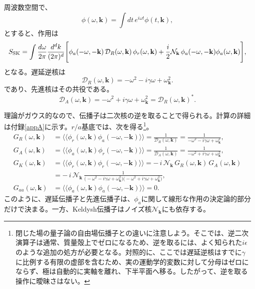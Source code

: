 \documentclass[a4paper,11pt,oneside]{article}
\theoremstyle{definition}
\numberwithin{equation}{section}
\begin{document}
周波数空間で、
\begin{equation}
\phi(\omega,\mathbf k)
=
\int dt\,e^{i\omega t}\phi(t,\mathbf k) ,
\end{equation}
とすると、作用は
\begin{align}
S_{\rm SK}
=
\int \frac{d\omega}{2\pi}\frac{d^d k}{(2\pi)^d}
\Bigg[
\phi_a(-\omega,-\mathbf k)\,
\mathcal D_R(\omega,\mathbf k)\,
\phi_r(\omega,\mathbf k)
+\frac{i}{2}\mathcal N_{\mathbf k}\,
\phi_a(-\omega,-\mathbf k)\phi_a(\omega,\mathbf k)
\Bigg] ,
\end{align}
となる。遅延逆核は
\begin{equation}\label{DRkernel}
\mathcal D_R(\omega,\mathbf k)
=
-\omega^2-i\gamma\omega+\omega_{\mathbf k}^2 .
\end{equation}
であり、先進核はその共役である。
\begin{equation}
\mathcal D_A(\omega,\mathbf k)
=
-\omega^2+i\gamma\omega+\omega_{\mathbf k}^2
=
\mathcal D_R(\omega,\mathbf k)^* .
\end{equation}


理論がガウス的なので、伝播子は二次核の逆を取ることで得られる。計算の詳細は付録\ref{appA}に示す。\(r/a\)基底では、次を得る\footnote{閉じた場の量子論の自由場伝播子との違いに注意しよう。そこでは、逆二次演算子は通常、質量殻上でゼロになるため、逆を取るには、よく知られた\(i\epsilon\)のような追加の処方が必要となる。対照的に、ここでは遅延逆核はすでに\(\gamma  \)に比例する有限の虚部を含むため、実の運動学的変数に対して分母はゼロにならず、極は自動的に実軸を離れ、下半平面へ移る。したがって、逆を取る操作に曖昧さはない。}。
\begin{align}
G_R(\omega,\mathbf k)
&=
\langle\!\langle \phi_r(\omega,\mathbf k)\phi_a(-\omega,-\mathbf k)\rangle\!\rangle
=
\frac{1}{\mathcal D_R(\omega,\mathbf k)}
=
\frac{1}{-\omega^2-i\gamma\omega+\omega_{\mathbf k}^2} ,
\label{GRfreq}
\\
G_A(\omega,\mathbf k)
&=
\langle\!\langle \phi_a(\omega,\mathbf k)\phi_r(-\omega,-\mathbf k)\rangle\!\rangle
=
\frac{1}{\mathcal D_A(\omega,\mathbf k)}
=
\frac{1}{-\omega^2+i\gamma\omega+\omega_{\mathbf k}^2} ,
\label{GAfreq}
\\
G_K(\omega,\mathbf k)
&=
\langle\!\langle \phi_r(\omega,\mathbf k)\phi_r(-\omega,-\mathbf k)\rangle\!\rangle
=
-\,i\,\mathcal N_{\mathbf k}\,
G_R(\omega,\mathbf k)\,G_A(\omega,\mathbf k)
\nonumber\\
&=
-\,i\,\mathcal N_{\mathbf k}\,
\frac{1}{\bigl(-\omega^2-i\gamma\omega+\omega_{\mathbf k}^2\bigr)
\bigl(-\omega^2+i\gamma\omega+\omega_{\mathbf k}^2\bigr)} ,
\label{GKfreq}
\\
G_{aa}(\omega,\mathbf k)
&=
\langle\!\langle \phi_a(\omega,\mathbf k)\phi_a(-\omega,-\mathbf k)\rangle\!\rangle
=
0 .
\end{align}
このように、遅延伝播子と先進伝播子は、$ \phi_{a}$に関して線形な作用の決定論的部分だけで決まる。一方、Keldysh伝播子はノイズ核\(\mathcal N_{\mathbf k}\)にも依存する。
\end{document}
